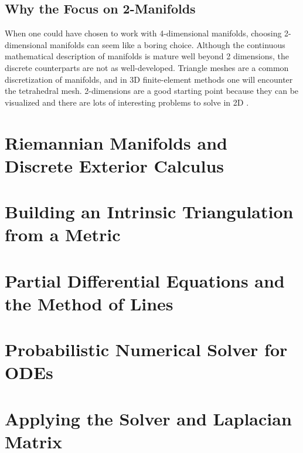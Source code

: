 \subsection*{Why the Focus on 2-Manifolds}
When one could have chosen to work with 4-dimensional manifolds, choosing 2-dimensional manifolds can seem like a boring choice. Although the continuous mathematical description of manifolds is mature well beyond 2 dimensions, the discrete counterparts are not as well-developed\cite{craneDDG}. Triangle meshes are a common discretization of manifolds, and in 3D finite-element methods one will encounter the tetrahedral mesh. 2-dimensions are a good starting point because they can be visualized and there are lots of interesting problems to solve in 2D \cite{walk_on_stars} \cite{repulsive_curves} \cite{diffusionnet}. 


\clearpage
\section{Riemannian Manifolds and Discrete Exterior Calculus}\label{sec:manifolds}


\clearpage
\section{Building an Intrinsic Triangulation from a Metric}\label{sec:intrinsic_triangulation}


\clearpage
\section{Partial Differential Equations and the Method of Lines}\label{sec:pde}


\clearpage
\section{Probabilistic Numerical Solver for ODEs}\label{sec:prior}


\clearpage
\section{Applying the Solver and Laplacian Matrix}\label{sec:solver_experiments}


